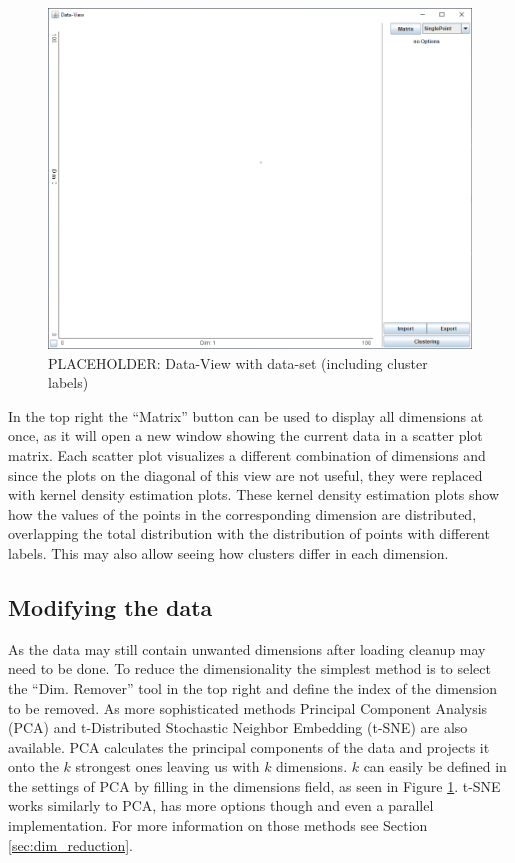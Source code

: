 \documentclass[
	a4paper,
	english,
	twoside,
	openright,               
	11pt                            
	]{report}
\begin{document}
\begin{figure}[h]
	\centering
	\includegraphics[scale=.45]{data-view}
	\caption{PLACEHOLDER: Data-View with data-set (including cluster labels)}
	\label{fig:loaded-data}
\end{figure}

In the top right the ``Matrix'' button can be used to display all dimensions at once, as it will open a new window showing the current data in a scatter plot matrix. Each scatter plot visualizes a different combination of dimensions and since the plots on the diagonal of this view are not useful, they were replaced with kernel density estimation plots. These kernel density estimation plots show how the values of the points in the corresponding dimension are distributed, overlapping the total distribution with the distribution of points with different labels. This may also allow seeing how clusters differ in each dimension.

\subsection{Modifying the data}

As the data may still contain unwanted dimensions after loading cleanup may need to be done. To reduce the dimensionality the simplest method is to select the ``Dim. Remover'' tool in the top right and define the index of the dimension to be removed. As more sophisticated methods Principal Component Analysis (PCA) \cite{pca} and t-Distributed Stochastic Neighbor Embedding (t-SNE) \cite{Maaten2008VisualizingDU} are also available. PCA calculates the principal components of the data and projects it onto the $k$ strongest ones leaving us with $k$ dimensions. $k$ can easily be defined in the settings of PCA by filling in the dimensions field, as seen in Figure \ref{fig:loaded-data}. t-SNE works similarly to PCA, has more options though and even a parallel implementation. For more information on those methods see Section \ref{sec:dim_reduction}.
\end{document}
